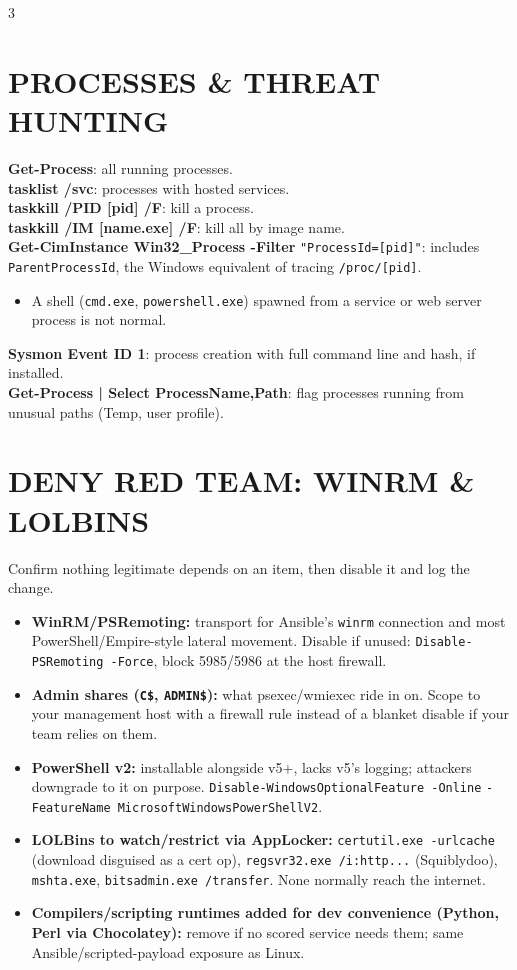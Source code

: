 \documentclass[7pt,landscape]{article}
\begin{document}
\begin{multicols*}{3}
\section{PROCESSES \& THREAT HUNTING}
\textbf{Get-Process}: all running processes. \\
\textbf{tasklist /svc}: processes with hosted services. \\
\textbf{taskkill /PID [pid] /F}: kill a process. \\
\textbf{taskkill /IM [name.exe] /F}: kill all by image name. \\
\textbf{Get-CimInstance Win32\_Process -Filter} \newline \texttt{"ProcessId=[pid]"}: includes \texttt{ParentProcessId}, the Windows equivalent of tracing \texttt{/proc/[pid]}.
\begin{itemize}
    \item A shell (\texttt{cmd.exe}, \texttt{powershell.exe}) spawned from a service or web server process is not normal.
\end{itemize}
\textbf{Sysmon Event ID 1}: process creation with full command line and hash, if installed. \\
\textbf{Get-Process | Select ProcessName,Path}: flag processes running from unusual paths (Temp, user profile).

\section{DENY RED TEAM: WINRM \& LOLBINS}
Confirm nothing legitimate depends on an item, then disable it and log the change.
\begin{itemize}
    \item \textbf{WinRM/PSRemoting:} transport for Ansible's \texttt{winrm} connection and most PowerShell/Empire-style lateral movement. Disable if unused: \texttt{Disable-PSRemoting -Force}, block 5985/5986 at the host firewall.
    \item \textbf{Admin shares (\texttt{C\$}, \texttt{ADMIN\$}):} what psexec/wmiexec ride in on. Scope to your management host with a firewall rule instead of a blanket disable if your team relies on them.
    \item \textbf{PowerShell v2:} installable alongside v5+, lacks v5's logging; attackers downgrade to it on purpose. \texttt{Disable-WindowsOptionalFeature -Online} \newline \texttt{-FeatureName MicrosoftWindowsPowerShellV2}.
    \item \textbf{LOLBins to watch/restrict via AppLocker:} \texttt{certutil.exe -urlcache} (download disguised as a cert op), \texttt{regsvr32.exe /i:http...} (Squiblydoo), \texttt{mshta.exe}, \texttt{bitsadmin.exe /transfer}. None normally reach the internet.
    \item \textbf{Compilers/scripting runtimes added for dev convenience (Python, Perl via Chocolatey):} remove if no scored service needs them; same Ansible/scripted-payload exposure as Linux.
\end{itemize}


\end{multicols*}
\end{document}
